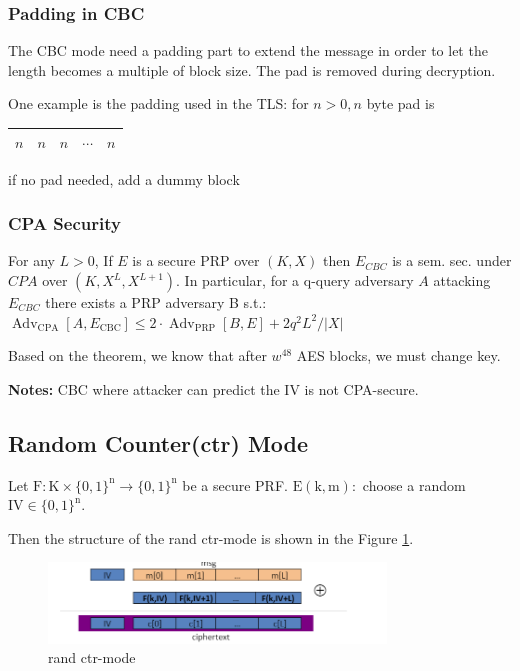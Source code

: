 \subsubsection{Padding in CBC}

The CBC mode need a padding part to extend the message in order to let the length becomes a multiple of block size. The pad is removed during decryption.

One example is the padding used in the TLS: for $n>0, n$ byte pad is \begin{tabular}{|l|l|l|l|l|} \hline$n$ & $n$ & $n$ & $\cdots$ & $n$ \\ \hline \end{tabular}
if no pad needed, add a dummy block


\subsubsection{CPA Security}

\begin{theorem} 
    For any $L>0$,
    If $E$ is a secure PRP over $(K, X)$ then
    $E_{C B C}$ is a sem. sec. under $C P A$ over $\left(K, X^{L}, X^{L+1}\right)$.
    In particular, for a q-query adversary $A$ attacking $E_{C B C}$ there exists a PRP adversary B s.t.:
    $\operatorname{Adv}_{\mathrm{CPA}}\left[A, E_{\mathrm{CBC}}\right] \leq 2 \cdot \operatorname{Adv}_{\mathrm{PRP}}[B, E]+2 q^{2} L^{2} /|X|$
\end{theorem}

Based on the theorem, we know that after $w^{48}$ AES blocks, we must change key.

\textbf{Notes: } CBC where attacker can predict the IV is not CPA-secure.



\subsection{Random Counter(ctr) Mode}

Let $\mathrm{F}: \mathrm{K} \times\{0,1\}^{\mathrm{n}} \rightarrow\{0,1\}^{\mathrm{n}}$ be a secure PRF.
$\mathrm{E}(\mathrm{k}, \mathrm{m}):$ choose a random $\mathrm{IV} \in\{0,1\}^{\mathrm{n}}$.

Then the structure of the rand ctr-mode is shown in the Figure \ref{fig: 03 rand ctr-mode}.

\begin{figure}[h]
    \centering
    \includegraphics[width=0.8\textwidth]{Stanford_Crypto_1/fig/03_block_cipher/rand ctr-mode.png}
    \caption{rand ctr-mode}
    \label{fig: 03 rand ctr-mode}
\end{figure}

